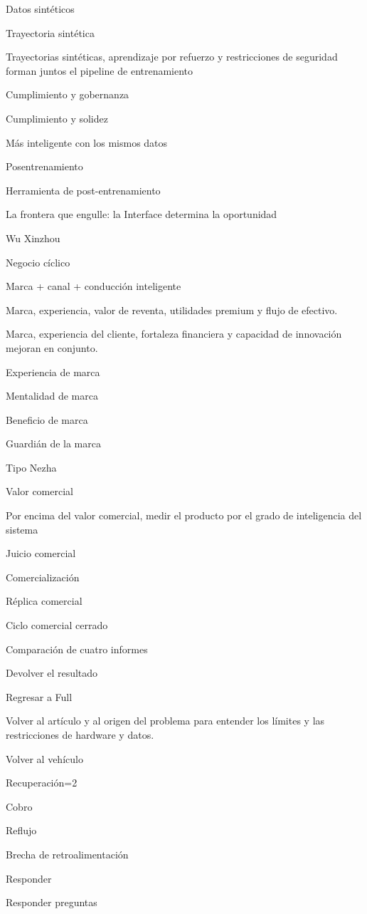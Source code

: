 \documentclass{article}
\begin{document}
Datos sintéticos

Trayectoria sintética

Trayectorias sintéticas, aprendizaje por refuerzo y restricciones de seguridad forman juntos el pipeline de entrenamiento

Cumplimiento y gobernanza

Cumplimiento y solidez

Más inteligente con los mismos datos

Posentrenamiento

Herramienta de post-entrenamiento

La frontera que engulle: la Interface determina la oportunidad

Wu Xinzhou

Negocio cíclico

Marca + canal + conducción inteligente

Marca, experiencia, valor de reventa, utilidades premium y flujo de efectivo.

Marca, experiencia del cliente, fortaleza financiera y capacidad de innovación mejoran en conjunto.

Experiencia de marca

Mentalidad de marca

Beneficio de marca

Guardián de la marca

Tipo Nezha

Valor comercial

Por encima del valor comercial, medir el producto por el grado de inteligencia del sistema

Juicio comercial

Comercialización

Réplica comercial

Ciclo comercial cerrado

Comparación de cuatro informes

Devolver el resultado

Regresar a Full

Volver al artículo y al origen del problema para entender los límites y las restricciones de hardware y datos.

Volver al vehículo

Recuperación=2

Cobro

Reflujo

Brecha de retroalimentación

Responder

Responder preguntas
\end{document}
